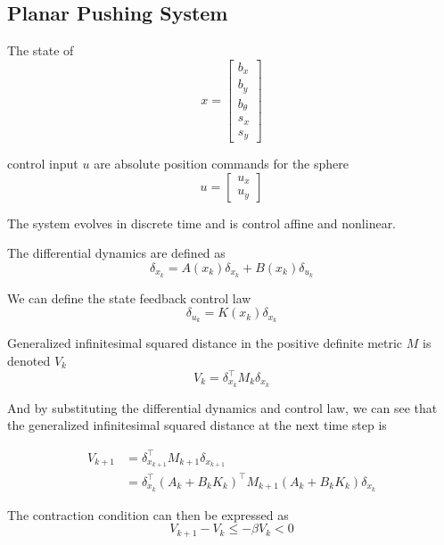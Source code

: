 \documentclass[conference]{IEEEtran}
\begin{document}
\subsection{Planar Pushing System}
The state of 
\begin{equation}
    x = \begin{bmatrix}b_x\\ b_y \\ b_{\theta}\\ s_x\\ s_y\end{bmatrix}
\end{equation}

control input $u$ are absolute position commands for the sphere
\begin{equation}
    u = \begin{bmatrix}u_x\\ u_y \end{bmatrix}
\end{equation}

The system evolves in discrete time and is control affine and nonlinear.

The differential dynamics are defined as
\begin{equation}
    \delta_{x_k} = A(x_k)\delta_{x_k} + B(x_k)\delta_{u_k}
\end{equation}

We can define the state feedback control law
\begin{equation}
    \delta_{u_k} = K(x_k)\delta_{x_k}
\end{equation}

Generalized infinitesimal squared distance in the positive definite metric $M$ is denoted $V_k$
\begin{equation}
    V_k = \delta^\top_{x_k} M_{k} \delta_{x_k}
\end{equation}

And by substituting the differential dynamics and control law, we can see that the generalized infinitesimal squared distance at the next time step is

\begin{equation}
	\begin{aligned}
	V_{k+1} & = \delta^\top_{x_{k+1}} M_{k+1} \delta_{x_{k+1}} \\
	& = \delta^\top_{x_k} (A_k + B_k K_k)^\top M_{k+1} (A_k + B_k K_k)\delta_{x_k}
	\end{aligned}
\end{equation}

The contraction condition can then be expressed as
\begin{equation}
	V_{k+1} - V_k \leq 
	- \beta V_k <
	0
\end{equation}
\end{document}
